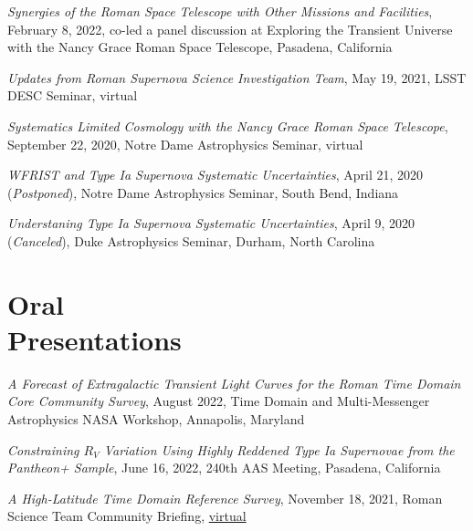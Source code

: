\documentclass[margin]{res}
\begin{document}
\begin{resume}
\hangindent=15pt 
\textit{Synergies of the Roman Space Telescope with Other Missions and Facilities}, February 8, 2022, co-led a panel discussion at Exploring the Transient Universe with the Nancy Grace Roman Space Telescope, Pasadena, California
\vspace{-12pt}

\hangindent=15pt 
{\it Updates from Roman Supernova Science Investigation Team}, May 19, 2021, LSST DESC Seminar, virtual
\vspace{-12pt}

\hangindent=15pt 
{\it Systematics Limited Cosmology with the Nancy Grace Roman Space Telescope}, September 22, 2020, Notre Dame Astrophysics Seminar, virtual
\vspace{-12pt}

\hangindent=15pt 
{\it WFRIST and Type Ia Supernova Systematic Uncertainties}, April 21, 2020 (\textit{Postponed}), Notre Dame Astrophysics Seminar, South Bend, Indiana
\vspace{-12pt}

\hangindent=15pt 
{\it Understaning Type Ia Supernova Systematic Uncertainties}, April 9, 2020 (\textit{Canceled}), Duke Astrophysics Seminar, Durham, North Carolina




\section{Oral \\Presentations}

\hangindent=15pt 
{\sl A Forecast of Extragalactic Transient Light Curves for the Roman Time Domain Core Community Survey}, August 2022, Time Domain and Multi-Messenger Astrophysics NASA Workshop, Annapolis, Maryland
\vspace{-12pt}

\hangindent=15pt 
{\sl Constraining $R_V$ Variation Using Highly Reddened Type Ia Supernovae from the Pantheon+ Sample}, June 16, 2022, 240th AAS Meeting, Pasadena, California
\vspace{-12pt}

\hangindent=15pt 
{\sl A High-Latitude Time Domain Reference Survey}, November 18, 2021, Roman Science Team Community Briefing, \href{https://roman.gsfc.nasa.gov/science/workshop112021/agenda.html#sn}{virtual}
\vspace{-12pt}



\end{resume}
\end{document}
